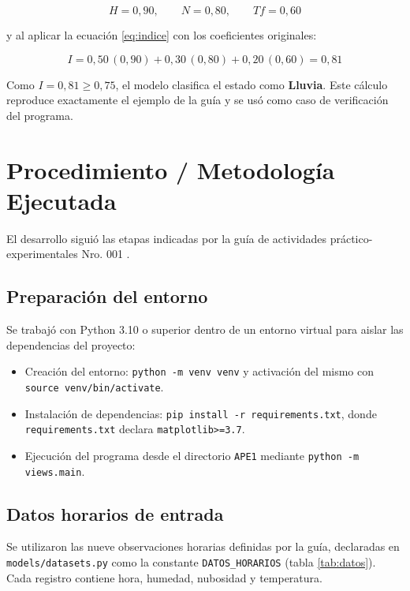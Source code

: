 \documentclass[11pt,a4paper]{article}
\begin{document}
\begin{equation}
H = 0{,}90, \qquad N = 0{,}80, \qquad Tf = 0{,}60
\end{equation}

y al aplicar la ecuaci\'on \eqref{eq:indice} con los coeficientes originales:

\begin{equation}
I = 0{,}50\,(0{,}90) + 0{,}30\,(0{,}80) + 0{,}20\,(0{,}60) = 0{,}81
\label{eq:ejemplo}
\end{equation}

Como $I = 0{,}81 \geq 0{,}75$, el modelo clasifica el estado como \textbf{Lluvia}. Este
c\'alculo reproduce exactamente el ejemplo de la gu\'ia y se us\'o como caso de
verificaci\'on del programa.

\section{Procedimiento / Metodolog\'ia Ejecutada}

El desarrollo sigui\'o las etapas indicadas por la gu\'ia de actividades
pr\'actico-experimentales Nro. 001 \cite{guaman2026ape1}.

\subsection{Preparaci\'on del entorno}

Se trabaj\'o con Python 3.10 o superior dentro de un entorno virtual para aislar las
dependencias del proyecto:

\begin{itemize}[leftmargin=*]
  \item Creaci\'on del entorno: \texttt{python -m venv venv} y activaci\'on del
        mismo con
        \texttt{source venv/bin/activate}.
  \item Instalaci\'on de dependencias: \texttt{pip install -r requirements.txt}, donde
        \texttt{requirements.txt} declara \texttt{matplotlib>=3.7}.
  \item Ejecuci\'on del programa desde el directorio \texttt{APE1} mediante
        \texttt{python -m views.main}.
\end{itemize}

\subsection{Datos horarios de entrada}

Se utilizaron las nueve observaciones horarias definidas por la gu\'ia, declaradas en
\texttt{models/datasets.py} como la constante \texttt{DATOS\_HORARIOS} (tabla
\ref{tab:datos}). Cada registro contiene hora, humedad, nubosidad y temperatura.
\end{document}
